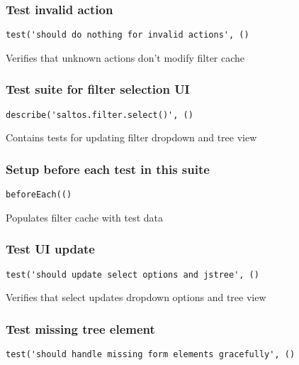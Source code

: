 \documentclass[a4paper]{article}
\begin{document}
\subsubsection{Test invalid action}

\begin{lstlisting}
test('should do nothing for invalid actions', ()
\end{lstlisting}

Verifies that unknown actions don't modify filter cache

\hypertarget{toc609}{}
\subsubsection{Test suite for filter selection UI}

\begin{lstlisting}
describe('saltos.filter.select()', ()
\end{lstlisting}

Contains tests for updating filter dropdown and tree view

\hypertarget{toc610}{}
\subsubsection{Setup before each test in this suite}

\begin{lstlisting}
beforeEach(()
\end{lstlisting}

Populates filter cache with test data

\hypertarget{toc611}{}
\subsubsection{Test UI update}

\begin{lstlisting}
test('should update select options and jstree', ()
\end{lstlisting}

Verifies that select updates dropdown options and tree view

\hypertarget{toc612}{}
\subsubsection{Test missing tree element}

\begin{lstlisting}
test('should handle missing form elements gracefully', ()
\end{lstlisting}
\end{document}
